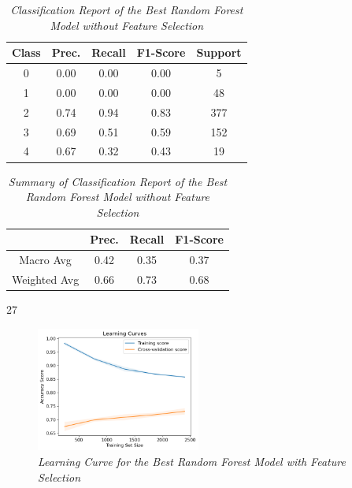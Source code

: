 \begin{table}[!ht]
    \begin{center}
        \begin{tabular}{c|c|c|c|c}			
            \hline
            Class & Prec. & Recall & F1-Score & Support \\
            \hline\hline
            0 & 0.00 & 0.00 & 0.00 & 5 \\
            1 & 0.00 & 0.00 & 0.00 & 48 \\
            2 & 0.74 & 0.94 & 0.83 & 377 \\
            3 & 0.69 & 0.51 & 0.59 & 152 \\
            4 & 0.67 & 0.32 & 0.43 & 19\\
            \hline
        \end{tabular}

        \caption{\textit{Classification Report of the Best Random Forest Model without Feature Selection}}
        \label{rf-ft-report}

    \end{center}
\end{table}
\begin{table}[!ht]
    \begin{center}
        \begin{tabular}{c||c|c|c}			
            \hline
             & Prec. & Recall & F1-Score \\
             \hline\hline
            Macro Avg & 0.42 & 0.35 & 0.37 \\
            Weighted Avg & 0.66 & 0.73 & 0.68 \\
            \hline
        \end{tabular}

        \caption{\textit{Summary of Classification Report of the Best Random Forest Model without Feature Selection}}
  27      \label{rf-ft-report-sum}

    \end{center}
\end{table}
\begin{figure}[!ht]
    \includegraphics[width = 0.48\textwidth]{res/rf-ft-lc.png}
    \caption{\textit{Learning Curve for the Best Random Forest Model with Feature Selection}}
    \label{fig:rf-ft-lc}
\end{figure}

